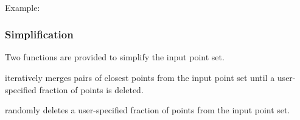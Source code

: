   \\


Example:



\subsubsection{Simplification}

Two functions are provided to simplify the input point set.

 iteratively merges pairs of closest points from the input point set until a user-specified fraction of points is deleted.


 randomly deletes a user-specified fraction of points from the input point set.

  \\
  \\

